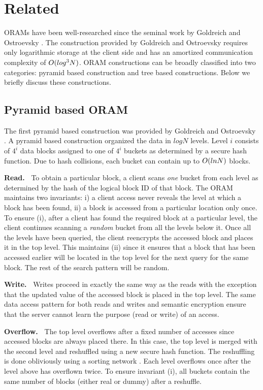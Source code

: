 \section{Related}
\label{oram:related}

ORAMs have been well-researched since the seminal work by Goldreich and Ostroevsky \cite{goldreich}. 
The construction provided by Goldreich and Ostroevsky requires only logarithmic storage at the client 
side and has an amortized communication complexity of $O(log^{3}N)$. ORAM constructions can be 
broadly classified into two categories: pyramid based construction and tree based constructions. 
Below we briefly discuss these constructions.


\subsection{Pyramid based ORAM}
\label{oram:related:pyramid}
%
The first pyramid based construction was provided by Goldreich and 
Ostroevsky \cite{goldreich}. A pyramid based construction organized the data in $logN$ levels. 
Level $i$ consists of $4^{i}$ data blocks assigned to one of $4^{i}$ buckets as determined by a secure 
hash function. Due to hash collisions, each bucket can contain up to $O(ln N)$ blocks.

{\bf Read.~}
%
To obtain a particular block, a client scans {\em one} bucket from each level as determined by 
the hash of the logical block ID of that block. The ORAM maintains two invariants: i) a client 
access never reveals the level at which a block has been found, ii) a block is accessed 
from a particular location only once. To ensure (i), after a client has found the required block 
at a particular level, the client continues scanning a {\em random} bucket from all the levels 
below it. Once all the levels have been queried, the client reencrypts the accessed block and places 
it in the top level. This maintains (ii) since it ensures that a block that has been accessed earlier 
will be located in the top level for the next query for the same block. The rest of the search pattern will 
be random. 

{\bf Write.~} 
%
Writes proceed in exactly the same way as the reads with the exception that the updated value of the accessed block 
is placed in the top level. The same data access pattern for both reads and writes and semantic encryption ensure that 
the server cannot learn the purpose (read or write) of an access.

{\bf Overflow.~}
%
The top level overflows after a fixed number of accesses since accessed blocks are always placed there. In this case, the top level 
is merged with the second level and reshuffled using a new secure hash function. The reshuffling is done obliviously using a sorting 
network \cite{goldreich,bforam,randomizedshellsort}. Each level overflows once after the level above has overflown twice. To ensure invariant 
(i), all buckets contain the same number of blocks (either real or dummy) after a reshuffle.


